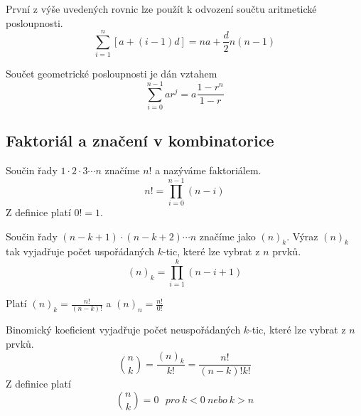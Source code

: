 \begin{theorem}
První z výše uvedených rovnic lze použít k odvození součtu aritmetické posloupnosti.
\begin{equation*}
\sum_{i = 1}^n [a + (i - 1)d] = na + \frac{d}{2}n(n - 1)
\end{equation*}
\end{theorem}

\begin{theorem}
Součet geometrické posloupnosti je dán vztahem
\begin{equation*}
\sum_{i = 0}^{n - 1} ar^j = a \frac{1 - r^n}{1 - r}
\end{equation*}
\end{theorem}

\subsection{Faktoriál a značení v kombinatorice}

\begin{definition}[Faktoriál]
Součin řady $1 \cdot 2 \cdot 3 \cdots n$ značíme $n!$ a nazýváme faktoriálem.
\begin{equation*}
n! = \prod_{i = 0}^{n - 1} (n - i)
\end{equation*}
Z definice platí $0! = 1$.
\end{definition}

\begin{definition}
Součin řady $(n - k + 1) \cdot (n - k + 2) \cdots n$ značíme jako $(n)_k$. Výraz $(n)_k$ tak vyjadřuje počet uspořádaných $k$-tic, které lze vybrat z $n$ prvků.
\begin{equation*}
(n)_k = \prod_{i = 1}^k (n - i + 1)
\end{equation*}
\end{definition}
Platí $(n)_k = \frac{n!}{(n - k)!}$ a $(n)_n = \frac{n!}{0!}$

\begin{definition}
Binomický koeficient vyjadřuje počet neuspořádaných $k$-tic, které lze vybrat z $n$ prvků.
\begin{equation*}
\binom{n}{k} = \frac{(n)_k}{k!} = \frac{n!}{(n - k)!k!}
\end{equation*}
Z definice platí
\begin{equation*}
\binom{n}{k} = 0 ~~~\textit{pro} ~ k < 0 ~ \textit{nebo} ~ k > n
\end{equation*}
\end{definition}

